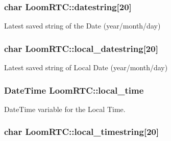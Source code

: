 \subsubsection[{\texorpdfstring{datestring}{datestring}}]{\setlength{\rightskip}{0pt plus 5cm}char Loom\+R\+T\+C\+::datestring\mbox{[}20\mbox{]}\hspace{0.3cm}{\ttfamily [protected]}}\hypertarget{class_loom_r_t_c_a86d3babf565f32bcbdffcf6e2a5efcdd}{}\label{class_loom_r_t_c_a86d3babf565f32bcbdffcf6e2a5efcdd}


Latest saved string of the Date (year/month/day) 

\subsubsection[{\texorpdfstring{local\+\_\+datestring}{local_datestring}}]{\setlength{\rightskip}{0pt plus 5cm}char Loom\+R\+T\+C\+::local\+\_\+datestring\mbox{[}20\mbox{]}\hspace{0.3cm}{\ttfamily [protected]}}\hypertarget{class_loom_r_t_c_a9692826e2c5093e528645a619fc16bc9}{}\label{class_loom_r_t_c_a9692826e2c5093e528645a619fc16bc9}


Latest saved string of Local Date (year/month/day) 

\subsubsection[{\texorpdfstring{local\+\_\+time}{local_time}}]{\setlength{\rightskip}{0pt plus 5cm}Date\+Time Loom\+R\+T\+C\+::local\+\_\+time\hspace{0.3cm}{\ttfamily [protected]}}\hypertarget{class_loom_r_t_c_ab3d490dd52a5e2d2413d1f0c00944a7b}{}\label{class_loom_r_t_c_ab3d490dd52a5e2d2413d1f0c00944a7b}


Date\+Time variable for the Local Time. 

\subsubsection[{\texorpdfstring{local\+\_\+timestring}{local_timestring}}]{\setlength{\rightskip}{0pt plus 5cm}char Loom\+R\+T\+C\+::local\+\_\+timestring\mbox{[}20\mbox{]}\hspace{0.3cm}{\ttfamily [protected]}}\hypertarget{class_loom_r_t_c_ae8fe182cd1fc3f7c66ef6b3ee353c51f}{}\label{class_loom_r_t_c_ae8fe182cd1fc3f7c66ef6b3ee353c51f}



